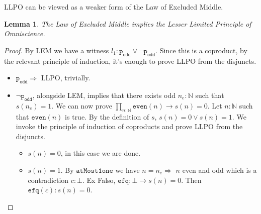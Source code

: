 \documentclass[12pt]{report}
\newtheorem{lem}[thm]{Lemma}
\begin{document}
LLPO can be viewed as a weaker form of the Law of Excluded Middle. 

\begin{lem} 
The Law of Excluded Middle implies the Lesser Limited Principle of Omniscience.
\end{lem}

\begin{proof}
By LEM we have a witness $ l_1 :\mathtt{p_{odd}} \vee \neg \mathtt{p_{odd}}$. 
Since this is a coproduct, by the relevant principle of induction, it's enough to prove LLPO from the disjuncts. 
\begin{itemize}
	\item $\mathtt{p_{odd}} \Rightarrow $ LLPO, trivially.

	\item $\neg \mathtt{p_{odd}}$, alongside LEM, implies that there exists odd $n_e : \mathbb{N}$ such that $s(n_e) = 1$. 
	We can now prove $\prod_{n : \mathbb{N}} \mathtt{even}(n) \rightarrow s(n) = 0$. 
	Let $n : \mathbb{N}$ such that $\mathtt{even}(n)$ is true. 
	By the definition of $s$, $s(n) = 0 \vee s(n) = 1$.
	We invoke the principle of induction of coproducts and prove LLPO from the disjuncts. 
	\begin{itemize}
		\item $s(n) = 0$, in this case we are done.
		\item $s(n) = 1$. 
		By $\mathtt{atMost1one}$ we have $n = n_e \Rightarrow $ $n$ even and odd which is a contradiction $c : \bot$. 
		Ex Falso,  $\mathtt{efq} : \bot \rightarrow s(n) = 0$. 
		Then $\mathtt{efq}(c) : s(n) = 0$.
	\end{itemize}
\end{itemize}
\end{proof}
\end{document}
